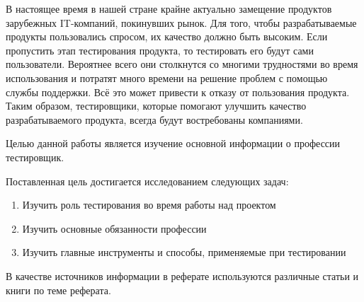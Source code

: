 В настоящее время в нашей стране крайне актуально замещение продуктов зарубежных
IT-компаний, покинувших рынок. Для того, чтобы разрабатываемые продукты 
пользовались спросом, их качество должно быть высоким. Если пропустить этап 
тестирования продукта, то тестировать его будут сами пользователи. Вероятнее 
всего они столкнутся со многими трудностями во время использования и потратят 
много времени на решение проблем с помощью службы поддержки. Всё это может 
привести к отказу от пользования продукта. Таким образом, тестировщики, которые 
помогают улучшить качество разрабатываемого продукта, всегда будут востребованы 
компаниями.

Целью данной работы является изучение основной информации о профессии 
тестировщик.

Поставленная цель достигается исследованием следующих задач:
\begin{enumerate}
    \item Изучить роль тестирования во время работы над проектом
    \item Изучить основные обязанности профессии
    \item Изучить главные инструменты и способы, применяемые при тестировании
\end{enumerate}

В качестве источников информации в реферате используются различные статьи и 
книги по теме реферата.